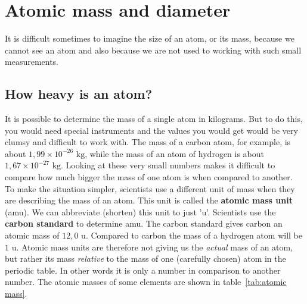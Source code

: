            \section{Atomic mass and diameter}
            \nopagebreak
            \label{m38756*id254850}It is difficult sometimes to imagine the size of an atom, or its mass, because we cannot see an atom and also because we are not used to working with such small measurements. 
            \subsection*{How heavy is an atom?}
            \nopagebreak
        \label{m38756*id254863}It is possible to determine the mass of a single atom in kilograms. But to do this, you would need special instruments and the values you would get would be very clumsy and difficult to work with. The mass of a carbon atom, for example, is about $1,99 \times {10}^{-26}\text{ kg}$, while the mass of an atom of hydrogen is about $1,67 \times{10}^{-27}\text{ kg}$. Looking at these very small numbers makes it difficult to compare how much bigger the mass of one atom is when compared to another.\\ 
        \label{m38756*id254908}To make the situation simpler, scientists use a different unit of mass when they are describing the mass of an atom. This unit is called the \textbf{atomic mass unit} (amu). We can abbreviate (shorten) this unit to just 'u'. Scientists use the \textbf{carbon standard} to determine amu. The carbon standard gives carbon an atomic mass of $12,0 \text{ u}$. Compared to carbon the mass of a hydrogen atom will be $1 \text{ u}$. Atomic mass units are therefore not giving us the \textsl{actual} mass of an atom, but rather its mass \textsl{relative} to the mass of one (carefully chosen) atom in the periodic table. In other words it is only a number in comparison to another number. The atomic masses of some elements are shown in table~\ref{tab:atomic mass}.

